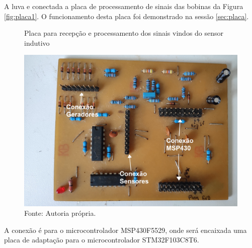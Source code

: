 A luva e conectada a placa de processamento de sinais das bobinas da Figura \ref{fig:placa1}. O funcionamento desta placa foi demonstrado na sessão \ref{sec:placa}. 

\begin{figure}[H]
   	\vspace{4mm}
   	\centering
   	\caption{Placa para recepção e processamento dos sinais vindos do sensor indutivo}
   	\label{fig:placa_in1}
   	\includegraphics[scale=0.10]{imagens/placa_ruani.jpg}
   	\caption*{Fonte: Autoria própria.}
\end{figure}
	
A conexão é para o microcontrolador MSP430F5529, onde será encaixada uma placa de adaptação para o microcontrolador STM32F103C8T6.        